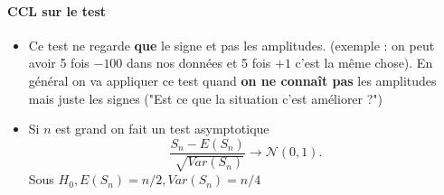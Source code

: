 \documentclass{article}
\theoremstyle{plain}%
\theoremstyle{definition}
\theoremstyle{remark}
\begin{document}
\paragraph*{CCL sur le test}
\begin{itemize}
    \item Ce test ne regarde \textbf{que} le signe et pas les amplitudes. (exemple : on peut avoir 5 fois $ -100 $ dans nos données et 5 fois $ +1 $ c'est la même chose). En général on va appliquer ce test quand \textbf{on ne connaît pas} les amplitudes mais juste les signes ("Est ce que la situation c'est améliorer ?")
    \item Si $ n $ est grand on fait un test asymptotique 
    \[
        \frac{S_n - E(S_n)}{\sqrt[]{Var(S_n)}} \to \mathcal{N}(0,1)
    .\]
    Sous $ H_0, E(S_n) = n/2, Var(S_n) = n/4 $ 
\end{itemize}
\end{document}
